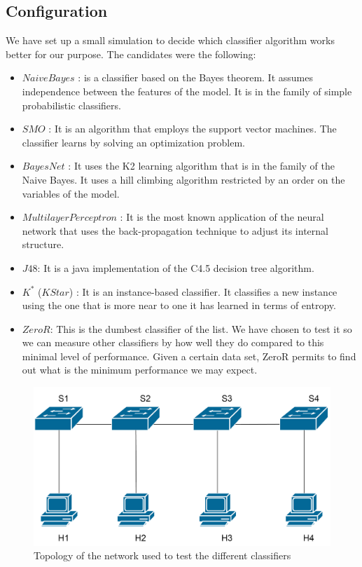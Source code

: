 \documentclass[12pt]{article}
\begin{document}
\subsection{Configuration}
We have set up a small simulation to decide which classifier algorithm works better for our purpose.
The candidates were the following:
\begin{itemize}
	\item $NaiveBayes$ \cite{naiveBayes}: is a classifier based on the Bayes theorem. It assumes independence between the features of the model. It is in the family of simple probabilistic classifiers.
	\item $SMO$ \cite{smo1,smo2,smo3}: It is an algorithm that employs the support vector machines. The classifier learns by solving an optimization problem.
	\item $BayesNet$ \cite{BayesNet}: It uses the K2 learning algorithm that is in the family of the Naive Bayes. It uses a hill climbing algorithm restricted by an order on the variables of the model.
	\item $MultilayerPerceptron$ \cite{MPL1,MPL2}: It is the most known application of the neural network that uses the back-propagation technique to adjust its internal structure.
	\item $J48$: It is a java implementation of the C4.5 \cite{j48} decision tree algorithm.
	\item $K^*$ ($KStar$) \cite{kstar}: It is an instance-based classifier. It classifies a new instance using the one that is more near to one it has learned in terms of entropy.
	\item $ZeroR$:  This is the dumbest classifier of the list. We have chosen to test it so we can measure other classifiers by how well they do compared to this minimal level of performance. Given a certain data set, ZeroR permits to find out what is the minimum performance we may expect.
\end{itemize}


\begin{figure}[h!]
	\centering
	\includegraphics[width=.7\textwidth]{img/networkTopologyScenario.png}
	\caption[]
	{Topology of the network used to test the different classifiers}
	\label{fig:netScenatioTopo}
\end{figure}
\end{document}

